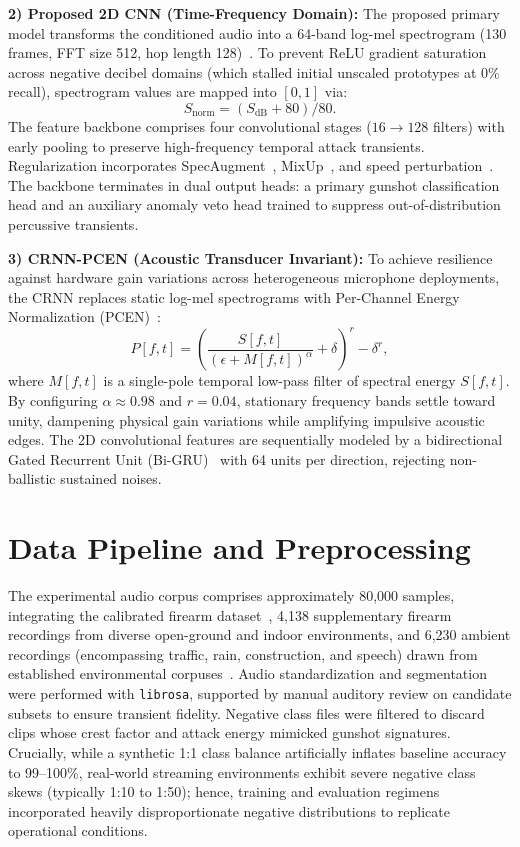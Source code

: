 \documentclass[conference]{IEEEtran}
\begin{document}
\textbf{2) Proposed 2D CNN (Time-Frequency Domain):} The proposed primary model transforms the conditioned audio into a 64-band log-mel spectrogram (130 frames, FFT size 512, hop length 128)~\cite{hershey2017}. To prevent ReLU gradient saturation across negative decibel domains (which stalled initial unscaled prototypes at 0\% recall), spectrogram values are mapped into $[0, 1]$ via:
\begin{equation}
    S_{\mathrm{norm}} = (S_{\mathrm{dB}} + 80) / 80.
    \label{eq:norm_db}
\end{equation}
The feature backbone comprises four convolutional stages ($16 \to 128$ filters) with early pooling to preserve high-frequency temporal attack transients. Regularization incorporates SpecAugment~\cite{park2019}, MixUp~\cite{zhang2018}, and speed perturbation~\cite{ko2015}. The backbone terminates in dual output heads: a primary gunshot classification head and an auxiliary anomaly veto head trained to suppress out-of-distribution percussive transients.

\textbf{3) CRNN-PCEN (Acoustic Transducer Invariant):} To achieve resilience against hardware gain variations across heterogeneous microphone deployments, the CRNN replaces static log-mel spectrograms with Per-Channel Energy Normalization (PCEN)~\cite{lostanlen2019}:
\begin{equation}
    P[f,t] = \left( \frac{S[f,t]}{(\epsilon + M[f,t])^{\alpha}} + \delta \right)^{r} - \delta^{r},
    \label{eq:pcen}
\end{equation}
where $M[f,t]$ is a single-pole temporal low-pass filter of spectral energy $S[f,t]$. By configuring $\alpha \approx 0.98$ and $r = 0.04$, stationary frequency bands settle toward unity, dampening physical gain variations while amplifying impulsive acoustic edges. The 2D convolutional features are sequentially modeled by a bidirectional Gated Recurrent Unit (Bi-GRU)~\cite{cho2014} with 64 units per direction, rejecting non-ballistic sustained noises.

\section{Data Pipeline and Preprocessing}
\label{sec:data}

The experimental audio corpus comprises approximately 80{,}000 samples, integrating the calibrated firearm dataset~\cite{dib2023}, 4{,}138 supplementary firearm recordings from diverse open-ground and indoor environments, and 6{,}230 ambient recordings (encompassing traffic, rain, construction, and speech) drawn from established environmental corpuses~\cite{salamon2014, piczak2015, fonseca2021}. Audio standardization and segmentation were performed with \texttt{librosa}, supported by manual auditory review on candidate subsets to ensure transient fidelity. Negative class files were filtered to discard clips whose crest factor and attack energy mimicked gunshot signatures. Crucially, while a synthetic 1:1 class balance artificially inflates baseline accuracy to 99--100\%, real-world streaming environments exhibit severe negative class skews (typically 1:10 to 1:50); hence, training and evaluation regimens incorporated heavily disproportionate negative distributions to replicate operational conditions.
\end{document}
